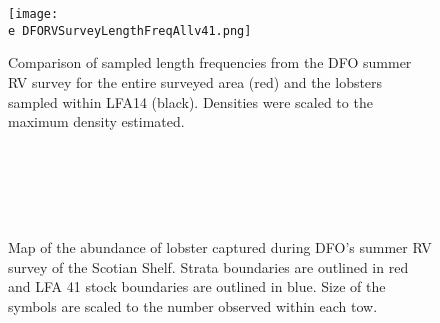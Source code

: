 \documentclass[11pt]{article}
\newcommand{\D}{.}
\newcommand{\e}{/backup/bio_data/bio.lobster/figures/} %
\begin{document}
\begin{figure}
\centering
    \texttt{[image: \\e DFORVSurveyLengthFreqAllv41.png]}
    \caption{Comparison of sampled length frequencies from the DFO summer RV survey for the entire surveyed area (red) and the lobsters sampled within LFA14 (black). Densities were scaled to the maximum density estimated.}
\end{figure}

        \begin{figure}
        \centering
        \\
        \\
        \\
        \\


         \caption{Map of the abundance of lobster captured during DFO's summer RV survey of the Scotian Shelf. Strata boundaries are outlined in red and LFA 41 stock boundaries are outlined in blue. Size of the symbols are scaled to the number observed within each tow.}
        \end{figure}
        \clearpage
\end{document}
